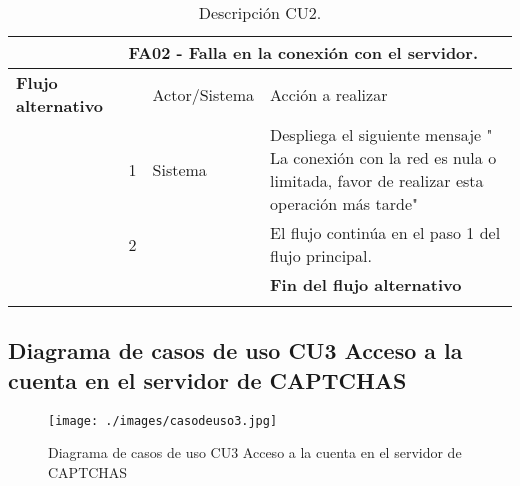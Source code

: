 \documentclass[12pt,oneside,onecolumn,openany]{report}
\begin{document}
\begin{longtable}[H]{| p{} | p{} |p{4cm}|p{5cm}|}
     \hline
     & \multicolumn{3}{|l|}{\textbf{FA02 - Falla en la conexión con el servidor}.}\\
     \hline
     \textbf{Flujo alternativo} & & Actor/Sistema & Acción a realizar\\
     \hline
     & 1 & Sistema & Despliega el siguiente mensaje " La conexión con la red es nula o limitada, favor de realizar esta operación más tarde"\\
     \hline
     & 2 & & El flujo continúa en el paso 1 del flujo principal.\\
     \hline
     &  & & \textbf{Fin del flujo alternativo}\\
    \caption{Descripción CU2.}
    \label{tabla:CU2}
\end{longtable}


\subsection{Diagrama de casos de uso CU3 Acceso a la cuenta en el servidor de CAPTCHAS}
\begin{figure}[H]
	\texttt{[image: ./images/casodeuso3.jpg]}
	\caption{Diagrama de casos de uso CU3 Acceso a la cuenta en el servidor de CAPTCHAS}
	\label{fig:4-4-1}
\end{figure}
\pagebreak
\end{document}
